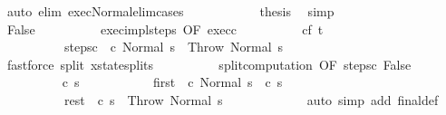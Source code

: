 \begin{isabellebody}
\ {\isacharparenleft}auto\ elim{\isacharcolon}\ exec{\isacharunderscore}Normal{\isacharunderscore}elim{\isacharunderscore}cases{\isacharparenright}\isanewline
\ \ \ \ \ \ \ \ \isamarkupfalse%
\ \isamarkupfalse%
\ {\isacharquery}thesis\ \isamarkupfalse%
\ simp\isanewline
\ \ \ \ \ \ \isamarkupfalse%
\isanewline
\ \ \ \ \ \ \ \ \isamarkupfalse%
\ False\isanewline
\ \ \ \ \ \ \ \ \isamarkupfalse%
\ exec{\isacharunderscore}impl{\isacharunderscore}steps\ {\isacharbrackleft}OF\ exec{\isacharunderscore}c\isanewline
\ \ \ \ \ \ \ \ \isamarkupfalse%
\ c\isactrlsub f\ t\ \ \isanewline
\ \ \ \ \ \ \ \ \ \ steps{\isacharunderscore}c\ {\isachardoublequoteopen}{\isasymGamma}{\isasymturnstile}\ {\isacharparenleft}c\ Normal\ s{\isacharparenright}\ {\isasymrightarrow}\isactrlsup {\isacharasterisk}\ {\isacharparenleft}Throw{\isacharcomma}\ Normal\ s{\isacharprime}{\isacharparenright}{\isachardoublequoteclose}\ \isanewline
\ \ \ \ \ \ \ \ \ \ \isamarkupfalse%
\ {\isacharparenleft}fastforce\ split{\isacharcolon}\ xstate{\isachardot}splits{\isacharparenright}\isanewline
\ \ \ \ \ \ \ \ \isamarkupfalse%
\ split{\isacharunderscore}computation\ {\isacharbrackleft}OF\ steps{\isacharunderscore}c\ False{\isacharbrackright}\isanewline
\ \ \ \ \ \ \ \ \isamarkupfalse%
\ c{\isacharprime}{\isacharprime}\ s{\isacharprime}{\isacharprime}\ \isanewline
\ \ \ \ \ \ \ \ \ \ first{\isacharcolon}\ {\isachardoublequoteopen}{\isasymGamma}{\isasymturnstile}\ {\isacharparenleft}c\ Normal\ s{\isacharparenright}\ {\isasymrightarrow}\ {\isacharparenleft}c{\isacharprime}{\isacharprime}{\isacharcomma}\ s{\isacharprime}{\isacharprime}{\isacharparenright}{\isachardoublequoteclose}\ \isanewline
\ \ \ \ \ \ \ \ \ \ rest{\isacharcolon}\ {\isachardoublequoteopen}{\isasymGamma}{\isasymturnstile}\ {\isacharparenleft}c{\isacharprime}{\isacharprime}{\isacharcomma}\ s{\isacharprime}{\isacharprime}{\isacharparenright}\ {\isasymrightarrow}\isactrlsup {\isacharasterisk}\ {\isacharparenleft}Throw{\isacharcomma}\ Normal\ s{\isacharprime}{\isacharparenright}{\isachardoublequoteclose}\ \isanewline
\ \ \ \ \ \ \ \ \ \ \isamarkupfalse%
\ {\isacharparenleft}auto\ simp\ add{\isacharcolon}\ final{\isacharunderscore}def{\isacharparenright}\isanewline

\end{isabellebody}

